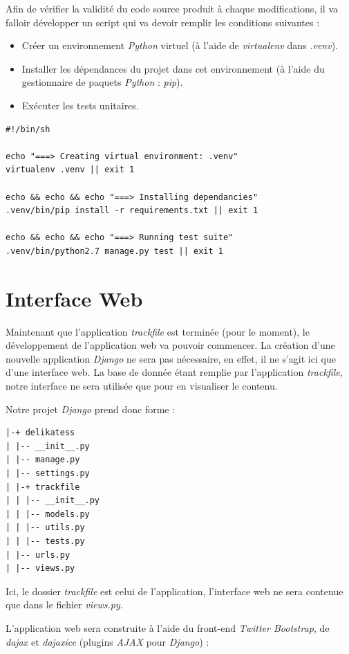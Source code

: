 Afin de vérifier la validité du code source produit à chaque modifications, il va falloir développer
un script qui va devoir remplir les conditions suivantes :

\begin{itemize}
     \item Créer un environnement \textit{Python} virtuel (à l'aide de \textit{virtualenv} dans \textit{.venv}).
     \item Installer les dépendances du projet dans cet environnement (à l'aide du gestionnaire de paquets \textit{Python} : \textit{pip}).
     \item Exécuter les tests unitaires.
\end{itemize}

\begin{verbatim}
#!/bin/sh

echo "===> Creating virtual environment: .venv"
virtualenv .venv || exit 1

echo && echo && echo "===> Installing dependancies"
.venv/bin/pip install -r requirements.txt || exit 1

echo && echo && echo "===> Running test suite"
.venv/bin/python2.7 manage.py test || exit 1
\end{verbatim}

\section{Interface Web}

Maintenant que l'application \textit{trackfile} est terminée (pour le moment), le développement de l'application web
va pouvoir commencer. La création d'une nouvelle application \textit{Django} ne sera pas nécessaire, en effet, il ne
s'agit ici que d'une interface web. La base de donnée étant remplie par l'application \textit{trackfile}, notre interface
ne sera utilisée que pour en visualiser le contenu.

Notre projet \textit{Django} prend donc forme :

\begin{verbatim}
|-+ delikatess
| |-- __init__.py
| |-- manage.py
| |-- settings.py
| |-+ trackfile
| | |-- __init__.py
| | |-- models.py
| | |-- utils.py
| | |-- tests.py
| |-- urls.py
| |-- views.py
\end{verbatim}

Ici, le dossier \textit{trackfile} est celui de l'application, l'interface web ne sera contenue que dans le fichier
\textit{views.py}.

L'application web sera construite à l'aide du front-end \textit{Twitter Bootstrap}, de \textit{dajax} et \textit{dajaxice}
(plugins \textit{AJAX} pour \textit{Django}) :

